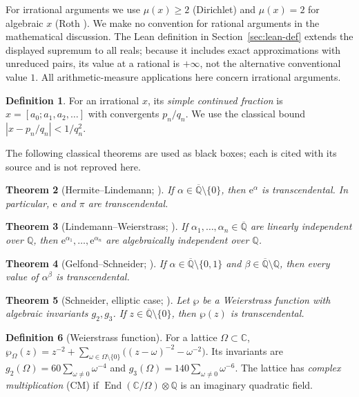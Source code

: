 \documentclass[11pt]{amsart}
\newtheorem{theorem}{Theorem}[section]
\theoremstyle{definition}
\newtheorem{definition}[theorem]{Definition}
\theoremstyle{remark}
\numberwithin{equation}{section}
\newcommand{\Q}{\mathbb{Q}}
\newcommand{\C}{\mathbb{C}}
\newcommand{\Qbar}{\overline{\mathbb{Q}}}
\newcommand{\irr}{\mu}
\newcommand{\ee}{\mathrm{e}}
\begin{document}
For irrational arguments we use $\irr(x)\ge2$ (Dirichlet) and $\irr(x)=2$ for algebraic $x$ (Roth \cite{Roth1955}). We make no convention for rational arguments in the mathematical discussion. The Lean definition in Section~\ref{sec:lean-def} extends the displayed supremum to all reals; because it includes exact approximations with unreduced pairs, its value at a rational is $+\infty$, not the alternative conventional value $1$. All arithmetic-measure applications here concern irrational arguments.

\begin{definition}
For an irrational $x$, its \emph{simple continued fraction} is $x=[a_0;a_1,a_2,\dots]$ with convergents $p_n/q_n$. We use the classical bound $|x-p_n/q_n|<1/q_n^2$.
\end{definition}

The following classical theorems are used as black boxes; each is cited with its source and is not reproved here.

\begin{theorem}[Hermite--Lindemann; {\cite{Hermite1873,Lindemann1882}}]\label{thm:HL}
If $\alpha\in\Qbar\setminus\{0\}$, then $\ee^\alpha$ is transcendental. In particular, $\ee$ and $\pi$ are transcendental.
\end{theorem}

\begin{theorem}[Lindemann--Weierstrass; {\cite{Lindemann1882}}]\label{thm:LW}
If $\alpha_1,\dots,\alpha_n\in\Qbar$ are linearly independent over $\Q$, then $\ee^{\alpha_1},\dots,\ee^{\alpha_n}$ are algebraically independent over $\Q$.
\end{theorem}

\begin{theorem}[Gelfond--Schneider; {\cite{GS1934}}]\label{thm:GS}
If $\alpha\in\Qbar\setminus\{0,1\}$ and $\beta\in\Qbar\setminus\Q$, then every value of $\alpha^\beta$ is transcendental.
\end{theorem}

\begin{theorem}[Schneider, elliptic case; {\cite{Duke}}]\label{thm:schneider}
Let $\wp$ be a Weierstrass function with algebraic invariants $g_2,g_3$. If $z\in\Qbar\setminus\{0\}$, then $\wp(z)$ is transcendental.
\end{theorem}

\begin{definition}[Weierstrass function]
For a lattice $\Omega\subset\C$, $\wp_\Omega(z)=z^{-2}+\sum_{\omega\in\Omega\setminus\{0\}}\bigl((z-\omega)^{-2}-\omega^{-2}\bigr)$. Its invariants are $g_2(\Omega)=60\sum_{\omega\ne0}\omega^{-4}$ and $g_3(\Omega)=140\sum_{\omega\ne0}\omega^{-6}$. The lattice has \emph{complex multiplication} (CM) if $\operatorname{End}(\C/\Omega)\otimes\Q$ is an imaginary quadratic field.
\end{definition}
\end{document}

